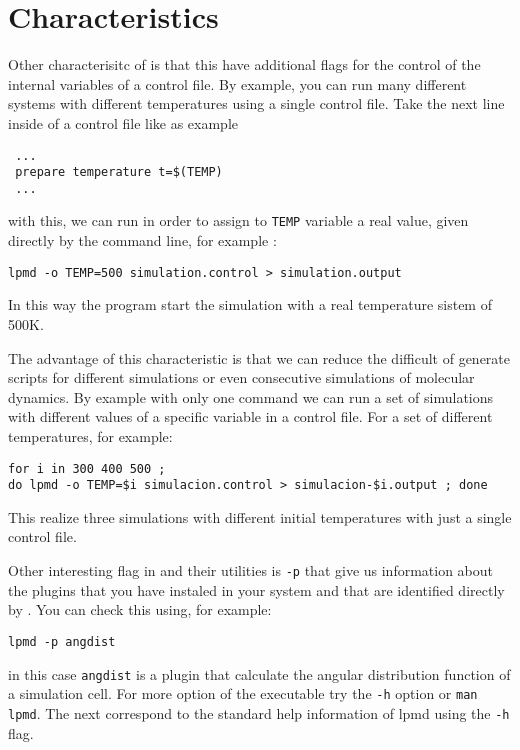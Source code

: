 \section{Characteristics}

Other characterisitc of {\lpmd} is that this have additional flags for the
control of the internal variables of a control file. By example, you can run
many different systems with different temperatures using a single control file.
Take the next line inside of a control file like as example

\begin{verbatim}
 ...
 prepare temperature t=$(TEMP)
 ...
\end{verbatim}
\noindent
with this, we can run {\lpmd} in order to assign to \verb|TEMP| variable a real
value, given directly by the command line, for example :

\begin{center}
 \texttt{lpmd -o TEMP=500 simulation.control > simulation.output}
\end{center}
\noindent
In this way the program start the simulation with a real temperature sistem of
500K.

The advantage of this characteristic is that we can reduce the difficult of
generate scripts for different simulations or even consecutive simulations of
molecular dynamics. By example with only one command we can run a set of
simulations with different values of a specific variable in a control file. For
a set of different temperatures, for example:

\begin{center}
 \texttt{for i in 300 400 500 ; \\do lpmd -o TEMP=\$i simulacion.control > simulacion-\$i.output ; done}
\end{center}
\noindent
This realize three simulations with different initial temperatures with just a
single control file.

Other interesting flag in {\lpmd} and their utilities is \verb|-p| that give
us information about the plugins that you have instaled in your system and that
are identified directly by {\lpmd}. You can check this using, for example:

\begin{center}
 \texttt{lpmd -p angdist}
\end{center}
\noindent
in this case \verb|angdist| is a plugin that calculate the angular distribution
function of a simulation cell. For more option of the executable try the
\verb|-h| option or \verb|man lpmd|. The next correspond to the standard help
information of lpmd using the \verb|-h| flag.

